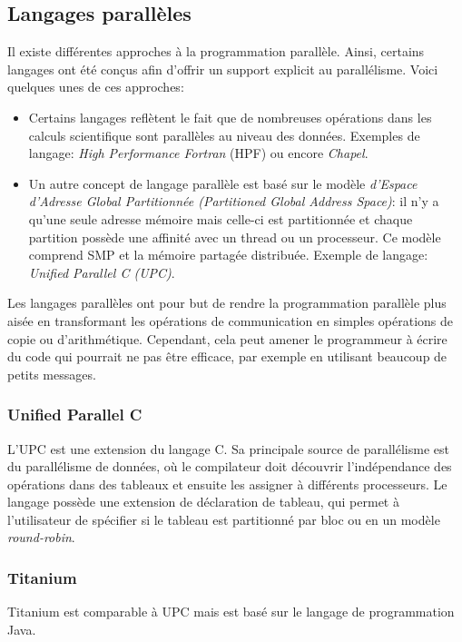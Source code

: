 	\subsection{Langages parallèles}
	Il existe différentes approches à la programmation parallèle. Ainsi, certains langages ont été conçus afin d'offrir un support explicit au parallélisme. Voici quelques unes de ces approches:
	\begin{itemize}
	\item Certains langages reflètent le fait que de nombreuses opérations dans les calculs scientifique sont parallèles au niveau des données. Exemples de langage: \textit{High Performance Fortran} (HPF) ou encore \textit{Chapel}.
	\item Un autre concept de langage parallèle est basé sur le modèle \textit{d'Espace d'Adresse Global Partitionnée (Partitioned Global Address Space)}: il n'y a qu'une seule adresse mémoire mais celle-ci est partitionnée et chaque partition possède une affinité avec un thread ou un processeur. Ce modèle comprend SMP et la mémoire partagée distribuée. Exemple de langage: \textit{Unified Parallel C (UPC)}.
	\end{itemize}
	
	Les langages parallèles ont pour but de rendre la programmation parallèle plus aisée en transformant les opérations de communication en simples opérations de copie ou d'arithmétique. Cependant, cela peut amener le programmeur à écrire du code qui pourrait ne pas être efficace, par exemple en utilisant beaucoup de petits messages.
	
		\subsubsection{Unified Parallel C} 
		L'UPC est une extension du langage C. Sa principale source de parallélisme est du parallélisme de données, où le compilateur doit découvrir l'indépendance des opérations dans des tableaux et ensuite les assigner à différents processeurs. Le langage possède une extension de déclaration de tableau, qui permet à l'utilisateur de spécifier si le tableau est partitionné par bloc ou en un modèle \textit{round-robin}.
	
		\subsubsection{Titanium} 
		Titanium est comparable à UPC mais est basé sur le langage de programmation Java.
	
